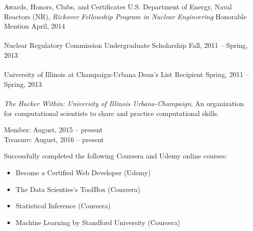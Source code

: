 \documentclass[10pt]{resume} %
\begin{document}
\begin{rSection}{Awards, Honors, Clubs, and Certificates}
U.S. Department of Energy, Naval Reactors (NR), {\it Rickover Fellowship Program in Nuclear Engineering} Honorable Mention \hfill{April, 2014} 
\\
\\
{ Nuclear Regulatory Commission Undergraduate Scholarship} \hfill{Fall, 2011 -- Spring, 2013}
\\
\\
University of Illinois at Champaign-Urbana Dean's List Recipient \hfill{Spring, 2011 -- Spring, 2013}
\\
\\
{\it{The Hacker Within: University of Illinois Urbana-Champaign}}, An organization for computational scientists to share and practice computational skills. 
\begin{flushright}
Member:   August, 2015 -- present
\\
Treasure: August, 2016 -- present
\end{flushright}

Successfully completed the following Coursera and Udemy online courses:
\begin{itemize}
	\item Become a Certified Web Developer (Udemy)
	\item The Data Scienties's ToolBox (Coursera)
	\item Statistical Inference (Coursera)
	\item Machine Learning by Standford University (Coursera)
\end{itemize}
\end{rSection}
\end{document}
